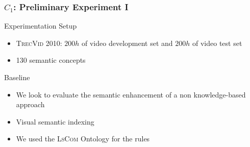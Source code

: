\begin{frame}
	\frametitle{$C_{1}$: Preliminary Experiment I}
	\small
	\begin{exampleblock}{Experimentation Setup}
		\begin{itemize}
			\item \textsc{TrecVid 2010}: $200h$ of video development set and $200h$ of video test set
			\item 130 semantic concepts
		  \end{itemize}
	\end{exampleblock}

	\begin{exampleblock}{Baseline}
		\begin{itemize}
			\item We look to evaluate the semantic enhancement  of a non knowledge-based approach 
			\alert{\citep{Elleuch2010}}
			\item \alert{Visual} semantic indexing
			\item We used the \alert{\textsc{LsCom}} Ontology for the rules
		 \end{itemize}
	\end{exampleblock}
\end{frame}

